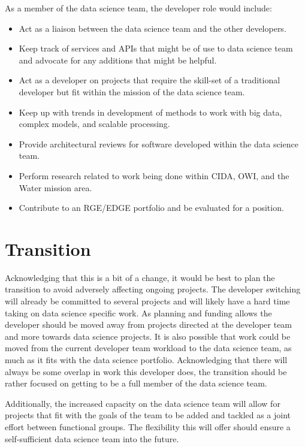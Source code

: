 \documentclass[twocolumn]{article}
\begin{document}
As a member of the data science team, the developer role would include:
\begin{itemize}
	\item Act as a liaison between the data science team and the other developers.
	\item Keep track of services and APIs that might be of use to data science team and advocate for any additions that might be helpful.
	\item Act as a developer on projects that require the skill-set of a traditional developer but fit within the mission of the data science team.
	\item Keep up with trends in development of methods to work with big data, complex models, and scalable processing.
	\item Provide architectural reviews for software developed within the data science team.
	\item Perform research related to work being done within CIDA, OWI, and the Water mission area.
	\item Contribute to an RGE/EDGE portfolio and be evaluated for a position.
\end{itemize}

\section{Transition}

Acknowledging that this is a bit of a change, it would be best to plan the transition to avoid adversely affecting ongoing projects.
The developer switching will already be committed to several projects and will likely have a hard time taking on data science specific work.
As planning and funding allows the developer should be moved away from projects directed at the developer team and more towards data science projects.
It is also possible that work could be moved from the current developer team workload to the data science team, as much as it fits with the data science portfolio.
Acknowledging that there will always be some overlap in work this developer does, the transition should be rather focused on getting to be a full member of the data science team.

\par
Additionally, the increased capacity on the data science team will allow for projects that fit with the goals of the team to be added and tackled as a joint effort between functional groups.
The flexibility this will offer should ensure a self-sufficient data science team into the future.
\end{document}
